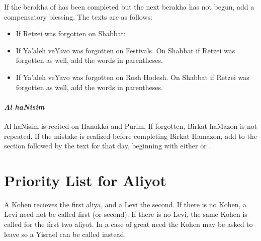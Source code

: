 If the berakha of  has been completed but the next berakha has not begun, add a compensatory blessing.  The texts are as follows:


\begin{itemize}
	\item If Retzei was forgotten on Shabbat:\\
	\item If Ya'aleh veYavo was forgotten on Festivals. On Shabbat if Retzei was forgotten as well, add the words in parentheses.\\
	\item If Ya'aleh veYavo was forgotten on Rosh \d{H}odesh.  On Shabbat if Retzei was forgotten as well, add the words in parentheses. \\
\end{itemize}

\paragraph{\textit{Al haNisim}}

Al haNisim is recited on \d{H}anukka and Purim.  If forgotten, Birkat haMazon is not repeated.  If the mistake is realized before completing Birkat Hamazon, add to the  section  followed by the text for that day, beginning with either  or  \parencite*[44:16]{Kitzur}.

\section{Priority List for Aliyot}

A Kohen recieves the first aliya, and a Levi the second.  If there is no Kohen, a Levi need not be called first (or second).  If there is no Levi, the same Kohen is called for the first two aliyot.  In a case of great need the Kohen may be asked to leave so a Yisrael can be called instead.

